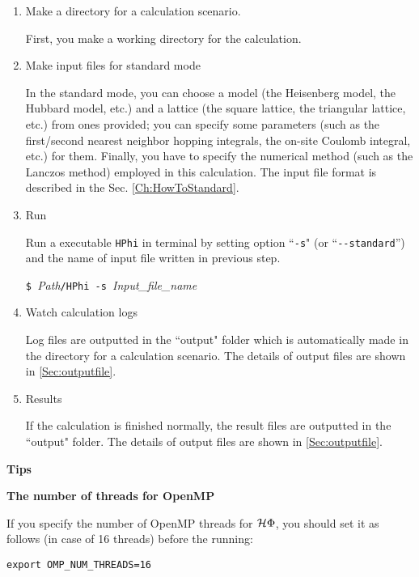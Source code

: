 \begin{enumerate}

\item  Make a directory for a calculation scenario. 

First, you make a working directory for the calculation.

\item  Make input files for standard mode

In the standard mode, you can choose a model (the Heisenberg model, the Hubbard model, etc.) and 
a lattice (the square lattice, the triangular lattice, etc.) from ones provided;
you can specify some parameters (such as the first/second nearest neighbor hopping integrals,
the on-site Coulomb integral, etc.) for them.
Finally, you have to specify the numerical method (such as the Lanczos method) employed in this calculation.
The input file format is described in the Sec. \ref{Ch:HowToStandard}.

\item  Run

Run a executable \verb|HPhi| in terminal by setting option ``\verb|-s|" (or ``\verb|--standard|'') and the name of input file written in previous step.

\verb|$ |\textit{Path}\verb|/HPhi -s |\textit{Input\_file\_name}

\item Watch calculation logs

Log files are outputted in the ``output" folder which is automatically made in the directory for a calculation scenario.
The details of output files are shown in \ref{Sec:outputfile}.

\item Results

If the calculation is finished normally, the result files are outputted in  the ``output" folder. The details of output files are shown in \ref{Sec:outputfile}.

\end{enumerate}

\begin{screen}
\Large 
{\bf Tips}
\normalsize

{\bf The number of threads for OpenMP}

If you specify the number of OpenMP threads for $\mathcal{H} \Phi$,
you should set it as follows (in case of 16 threads) before the running:
\begin{verbatim}
export OMP_NUM_THREADS=16
\end{verbatim}

\end{screen}


